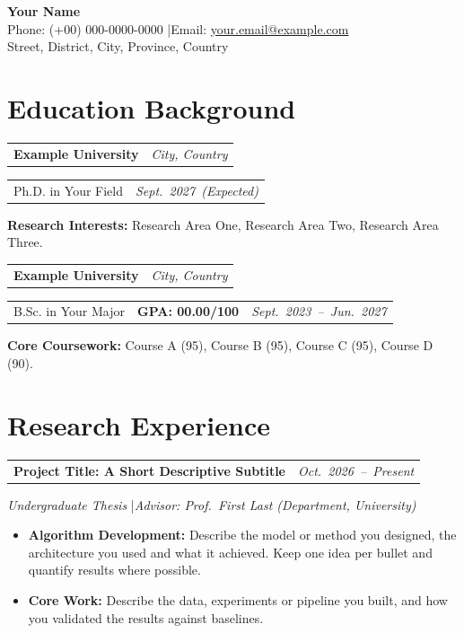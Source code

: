 \documentclass[11pt,a4paper]{article}
\makeatletter
\newcommand{\cvline}[2]{%
  \par\addvspace{2.5pt}%
  \begin{tabularx}{\textwidth}{@{}Y R{4.3cm}@{}}#1 & #2\end{tabularx}}
\newenvironment{cvitems}
  {\begin{itemize}[leftmargin=1.5em,itemsep=1pt,topsep=1pt,parsep=0pt,partopsep=0pt,label=\textbullet]}
  {\end{itemize}}
\makeatother
\begin{document}
\begin{center}
  {\Huge\bfseries Your Name}\\[6pt]
  Phone: (+00) 000-0000-0000 \quad|\quad Email: \href{mailto:your.email@example.com}{your.email@example.com}\\
  Street, District, City, Province, Country
\end{center}

\section*{Education Background}

\cvline{\textbf{Example University}}{\textit{City, Country}}
\begin{tabularx}{\textwidth}{@{}Y R{4.3cm}@{}}
  Ph.D. in Your Field & \mbox{\textit{Sept. 2027 (Expected)}}
\end{tabularx}
\vspace{1pt}
\textbf{Research Interests:} Research Area One, Research Area Two, Research Area Three.

\cvline{\textbf{Example University}}{\textit{City, Country}}
\begin{tabularx}{\textwidth}{@{}Y R{3.4cm} R{4.3cm}@{}}
  B.Sc. in Your Major & \textbf{GPA: 00.00/100} & \mbox{\textit{Sept. 2023 -- Jun. 2027}}
\end{tabularx}
\vspace{1pt}
\textbf{Core Coursework:} Course A (95), Course B (95), Course C (95), Course D (90).

\section*{Research Experience}

\cvline{\textbf{Project Title: A Short Descriptive Subtitle}}{\mbox{\textit{Oct. 2026 -- Present}}}
\textit{Undergraduate Thesis} \quad|\quad \textit{Advisor: Prof.\ First Last (Department, University)}
\begin{cvitems}
  \item \textbf{Algorithm Development:} Describe the model or method you designed, the architecture you used and what it achieved. Keep one idea per bullet and quantify results where possible.
  \item \textbf{Core Work:} Describe the data, experiments or pipeline you built, and how you validated the results against baselines.
\end{cvitems}
\end{document}
